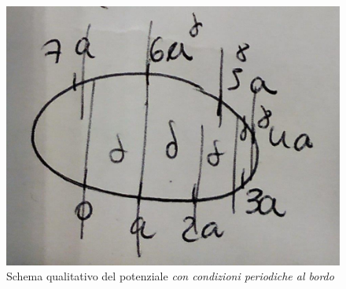 \documentclass[../../FisicaTeorica.tex]{subfiles}
\begin{document}
\begin{figure}[H]
\centering
\includegraphics[scale=0.4]{Immagini/13_12/image002.jpg}
\caption{Schema qualitativo del potenziale \textit{con condizioni periodiche al bordo}}
\end{figure}
\end{document}
